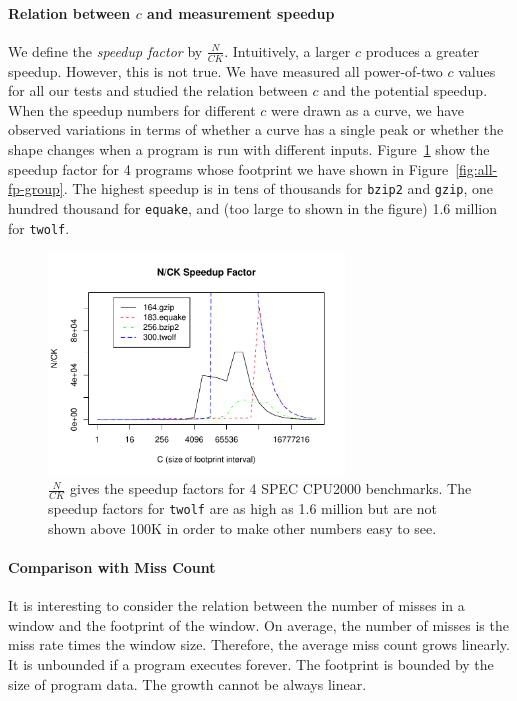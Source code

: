 
\paragraph{Relation between $c$ and measurement speedup}
We define the \emph{speedup factor} by $\frac{N}{CK}$.  Intuitively, a
larger $c$ produces a greater speedup.  However, this is not true.  We
have measured all power-of-two $c$ values for all our tests and
studied the relation between $c$ and the potential speedup.  When the
speedup numbers for different $c$ were drawn as a curve, we have
observed variations in terms of whether a curve has a single peak or
whether the shape changes when a program is run with different inputs.
Figure~\ref{fig:ck-speedups} show the speedup factor for 4 programs whose
footprint we have shown in Figure~\ref{fig:all-fp-group}.  The highest
speedup is in tens of thousands for {\tt bzip2} and {\tt gzip}, one
hundred thousand for {\tt equake}, and (too large to shown in the
figure) 1.6 million for {\tt twolf}.

\begin{figure}[h]
\centering
\includegraphics[width=0.7\textwidth]{figures/fp/ck}
\caption{$\frac{N}{CK}$ gives the speedup factors for 4 SPEC CPU2000
  benchmarks.  The speedup factors for {\tt twolf} are as high as 1.6
  million but are not shown above 100K in order to make other numbers
  easy to see.}
\label{fig:ck-speedups}
\end{figure}

\paragraph{Comparison with Miss Count}
It is interesting to consider the relation between the number of
misses in a window and the footprint of the window.  On average, the
number of misses is the miss rate times the window size.  Therefore,
the average miss count grows linearly.  It is unbounded if a program
executes forever.  The footprint is bounded by the size of program
data.  The growth cannot be always linear.

